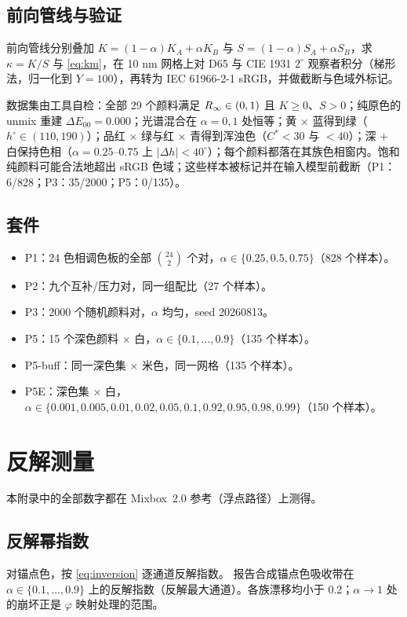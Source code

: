 \subsection{前向管线与验证}
前向管线分别叠加 $K=(1-\alpha)K_{A}+\alpha K_{B}$ 与 $S=(1-\alpha)S_{A}+\alpha S_{B}$，求 $\kappa=K/S$ 与 \cref{eq:km}，在 10 nm 网格上对 D65 与 CIE 1931 $2^{\circ}$ 观察者积分（梯形法，归一化到 $Y=100$），再转为 IEC 61966-2-1 sRGB，并做截断与色域外标记。

数据集由工具自检：全部 29 个颜料满足 $R_{\infty}\in(0,1)$ 且 $K\ge0$、$S>0$；纯原色的 unmix 重建 $\Delta E_{00}=0.000$；光谱混合在 $\alpha=0,1$ 处恒等；黄 $\times$ 蓝得到绿（$h^{\circ}\in(110,190)$）；品红 $\times$ 绿与红 $\times$ 青得到浑浊色（$C^{\ast}<30$ 与 $<40$）；深 $+$ 白保持色相（$\alpha=0.25$--$0.75$ 上 $|\Delta h|<40^{\circ}$）；每个颜料都落在其族色相窗内。饱和纯颜料可能合法地超出 sRGB 色域；这些样本被标记并在输入模型前截断（P1：6/828；P3：35/2000；P5：0/135）。

\subsection{套件}
\begin{itemize}
\item P1：24 色相调色板的全部 $\binom{24}{2}$ 个对，$\alpha\in\{0.25,0.5,0.75\}$（828 个样本）。
\item P2：九个互补/压力对，同一组配比（27 个样本）。
\item P3：2000 个随机颜料对，$\alpha$ 均匀，seed 20260813。
\item P5：15 个深色颜料 $\times$ 白，$\alpha\in\{0.1,\dots,0.9\}$（135 个样本）。
\item P5-buff：同一深色集 $\times$ 米色，同一网格（135 个样本）。
\item P5E：深色集 $\times$ 白，$\alpha\in\{0.001,0.005,0.01,0.02,0.05,0.1,0.92,0.95,0.98,0.99\}$（150 个样本）。
\end{itemize}

\section{反解测量}
\label{app:inversion}

本附录中的全部数字都在 Mixbox~2.0 参考（浮点路径）上测得。

\subsection{反解幂指数}
对锚点色，按 \cref{eq:inversion} 逐通道反解指数。 报告合成锚点色吸收带在 $\alpha\in\{0.1,\dots,0.9\}$ 上的反解指数（反解最大通道）。各族漂移均小于 0.2；$\alpha\to1$ 处的崩坏正是 $\varphi$ 映射处理的范围。

